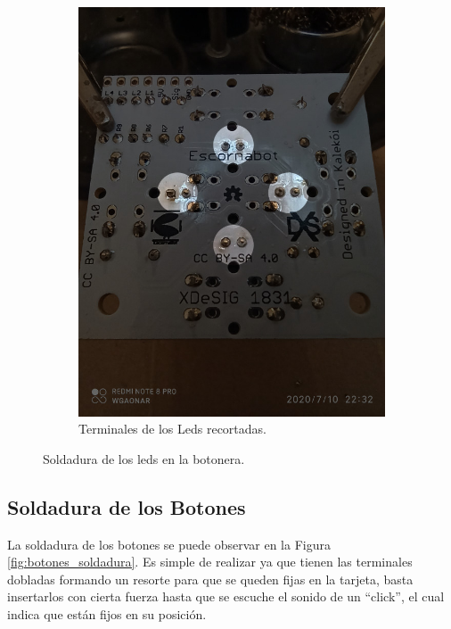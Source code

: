 \documentclass{article}
\begin{document}
\begin{figure}[H]
\begin{subfigure}[t]{0.3\textwidth}
        \includegraphics[width=0.9\columnwidth, height=1.2\columnwidth]{images/Botonera/led4.jpg}
        \caption{Terminales de los Leds recortadas.}
        \label{fig:botonera_led4}
    \end{subfigure}
    \caption{Soldadura de los leds en la botonera.}
    \label{fig:botonera_leds}
\end{figure}

\subsection{Soldadura de los Botones}
La soldadura de los botones se puede observar en la Figura \ref{fig:botones_soldadura}. Es simple de realizar ya que tienen las terminales dobladas formando un resorte para que se queden fijas en la tarjeta, basta insertarlos con cierta fuerza hasta que se escuche el sonido de un “click”, el cual indica que están fijos en su posición. 
\end{document}
